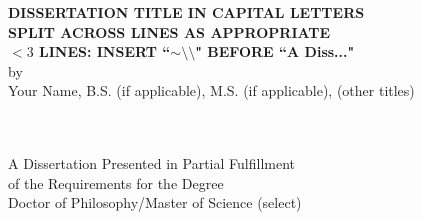 \renewcommand{\baselinestretch}{1.0}
\thispagestyle{empty}
\begin{center}
{\large \textbf{DISSERTATION TITLE IN CAPITAL LETTERS
\\                                                    %
\vspace{-.05in}                      %
SPLIT ACROSS LINES AS APPROPRIATE    %
\\                                   %
\vspace{-.2in}                                        %
$<3$ LINES: INSERT ``$\sim \setminus \setminus $"     %
BEFORE ``A Diss..."                                   %
}} \\
\vspace{-.2in}
by\\
Your Name, B.S. (if applicable), M.S. (if applicable), (other titles) \\
\vspace{1in}

~\\
~\\









A Dissertation Presented in Partial Fulfillment \\
\vspace{-.2in}
of the Requirements for the Degree \\
\vspace{-.2in}
Doctor of Philosophy/Master of Science (select) \\
\vspace{1in}


\end{center}
